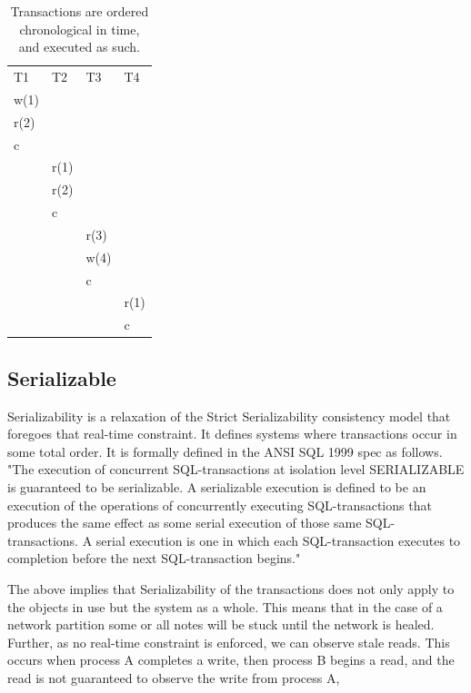 \documentclass[a4paper,10pt,titlepage]{report}
\begin{document}
\begin{table}[h]
\begin{tabular}{l|l|l|l}
T1   & T2   & T3   & T4   \\
w(1) &      &      &      \\
r(2) &      &      &      \\
c    &      &      &      \\
     & r(1) &      &      \\
     & r(2) &      &      \\
     & c    &      &      \\
     &      & r(3) &      \\
     &      & w(4) &      \\
     &      & c    &      \\
     &      &      & r(1) \\
     &      &      & c   
\end{tabular}
\caption{Transactions are ordered chronological in time, and executed as such.}

\end{table}

\subsection{Serializable}

Serializability is a relaxation of the Strict Serializability consistency model that foregoes that real-time constraint. It defines systems where transactions occur in some total order. It is formally defined in the ANSI SQL 1999 spec as follows. "The execution of concurrent SQL-transactions at isolation level SERIALIZABLE is guaranteed to be serializable. A serializable execution is defined to be an execution of the operations of concurrently executing SQL-transactions that produces the same effect as some serial execution of those same SQL-transactions. A serial execution is one in which each SQL-transaction executes to completion before the next SQL-transaction begins." \cite{ansisql1999}\\
\vspace{5mm}

The above implies that Serializability of the transactions does not only apply to the objects in use but the system as a whole. This means that in the case of a network partition some or all notes will be stuck until the network is healed. Further, as no real-time constraint is enforced,  we can observe stale reads. This occurs when process A completes a write, then process B begins a read, and the read is not guaranteed to observe the write from process A, 
\end{document}
